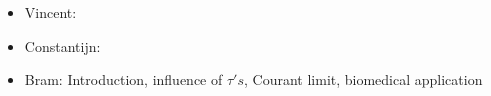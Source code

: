 \begin{itemize}
    \item Vincent:
    \item Constantijn:
    \item Bram: Introduction, influence of $\tau's$, Courant limit, biomedical application 
\end{itemize}